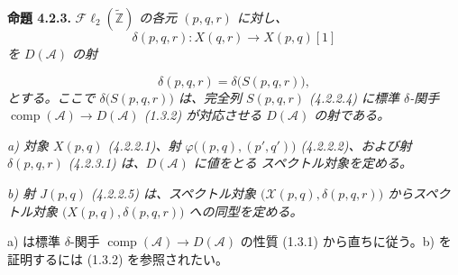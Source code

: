 \medskip\noindent\textbf{命題 4.2.3.}\quad
\textit{$\mathcal{F}\ell_2(\widetilde{\mathbb Z})$ の各元 $(p,q,r)$ に対し、}
\[
\delta(p,q,r)\colon X(q,r)\longrightarrow X(p,q)[1]
\]
\noindent\textit{を $D(\mathcal A)$ の射}

\begin{equation}
\delta(p,q,r)=\delta\bigl(S(p,q,r)\bigr),
\tag{4.2.3.1}
\end{equation}
\noindent\textit{とする。ここで $\delta\bigl(S(p,q,r)\bigr)$ は、完全列 $S(p,q,r)$
(4.2.2.4) に標準 $\delta$-関手
$\operatorname{comp}(\mathcal A)\longrightarrow D(\mathcal A)$ (1.3.2)
が対応させる $D(\mathcal A)$ の射である。}

\noindent\textit{a) 対象 $X(p,q)$ (4.2.2.1)、射
$\varphi\bigl((p,q),(p',q')\bigr)$ (4.2.2.2)、および射
$\delta(p,q,r)$ (4.2.3.1) は、$D(\mathcal A)$ に値をとる
スペクトル対象を定める。}

\noindent\textit{b) 射 $J(p,q)$ (4.2.2.5) は、スペクトル対象
$\bigl(\mathcal X(p,q),\delta(p,q,r)\bigr)$ からスペクトル対象
$\bigl(X(p,q),\delta(p,q,r)\bigr)$ への同型を定める。}

a) は標準 $\delta$-関手
$\operatorname{comp}(\mathcal A)\longrightarrow D(\mathcal A)$ の性質
(1.3.1) から直ちに従う。b) を証明するには (1.3.2) を参照されたい。
\endgroup
